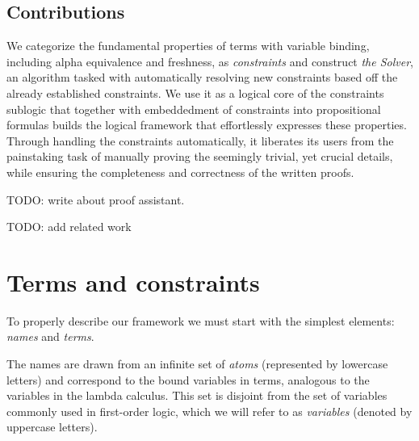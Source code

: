 \documentclass[english, mgr]{iithesis}
\renewcommand{\it}[1]{\textit{#1}}
\begin{document}
\section{Contributions}
We categorize the fundamental properties of terms with variable binding,
including alpha equivalence and freshness, as \it{constraints} and construct \it{the Solver},
an algorithm tasked with automatically resolving new constraints
based off the already established constraints.
We use it as a logical core of the constraints sublogic that together with embeddedment of constraints into propositional formulas builds the logical framework
that effortlessly expresses these properties.
Through handling the constraints automatically, it liberates its users from
the painstaking task of manually proving the seemingly trivial,
yet crucial details, while ensuring the completeness and correctness of the written proofs.

TODO: write about proof assistant.

TODO: add related work

\chapter{Terms and constraints}
To properly describe our framework we must start with the simplest elements:
\it{names} and \it{terms}.

The names are drawn from an infinite set of \it{atoms} (represented by lowercase letters)
and correspond to the bound variables in terms, analogous to the variables in the lambda calculus.
This set is disjoint from the set of variables commonly used in first-order logic,
which we will refer to as \it{variables} (denoted by uppercase letters).
\end{document}
